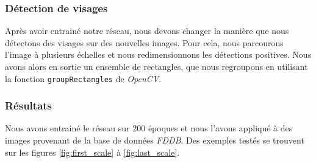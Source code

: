 \documentclass[a4paper,11pt]{article}
\begin{document}
\subsubsection{Détection de visages}
    
    Après avoir entrainé notre réseau, nous devons changer la manière que nous détectons des visages sur des nouvelles images.
    Pour cela, nous parcourons l'image à plusieurs échelles et nous redimensionnons les détections positives.
    Nous avons alors en sortie un ensemble de rectangles, que nous regroupons en utilisant la fonction \verb$groupRectangles$ de \textit{OpenCV}.

\subsubsection{Résultats}

    Nous avons entrainé le réseau sur 200 époques et nous l'avons appliqué à des images provenant de la base de données \textit{FDDB}.
    Des exemples testés se trouvent sur les figures \ref{fig:first_scale} à \ref{fig:last_scale}.
\end{document}
